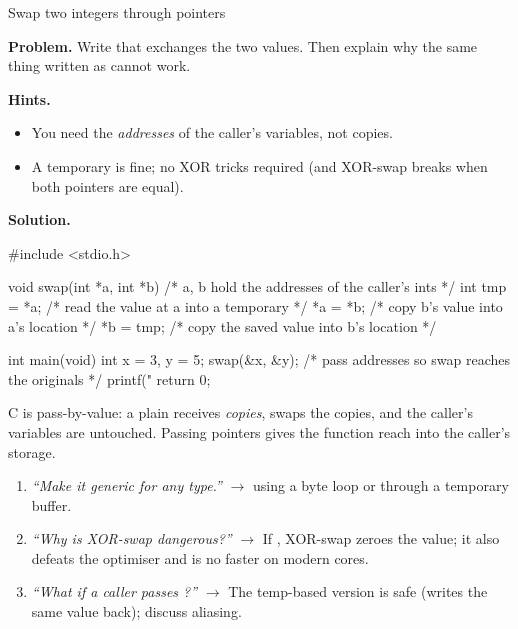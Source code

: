 \begin{gymproblem}{Swap two integers through pointers}

\textbf{Problem.} Write  that exchanges the
two values. Then explain why the same thing written as
 cannot work.

\textbf{Hints.}
\begin{itemize}
\item You need the \emph{addresses} of the caller's variables, not copies.
\item A temporary is fine; no XOR tricks required (and XOR-swap breaks when
  both pointers are equal).
\end{itemize}

\attempt

\textbf{Solution.}
\begin{cgym}
#include <stdio.h>

void swap(int *a, int *b) {   /* a, b hold the addresses of the caller's ints */
    int tmp = *a;             /* read the value at a into a temporary          */
    *a = *b;                  /* copy b's value into a's location              */
    *b = tmp;                 /* copy the saved value into b's location        */
}

int main(void) {
    int x = 3, y = 5;
    swap(&x, &y);             /* pass addresses so swap reaches the originals  */
    printf("%
    return 0;
}
\end{cgym}

C is pass-by-value: a plain  receives \emph{copies},
swaps the copies, and the caller's variables are untouched. Passing pointers
gives the function reach into the caller's storage.

\followups
\begin{enumerate}
\item \emph{``Make it generic for any type.''} $\rightarrow$
   using a byte loop or
   through a temporary buffer.
\item \emph{``Why is XOR-swap dangerous?''} $\rightarrow$ If ,
  XOR-swap zeroes the value; it also defeats the optimiser and is no faster
  on modern cores.
\item \emph{``What if a caller passes ?''} $\rightarrow$
  The temp-based version is safe (writes the same value back); discuss
  aliasing.
\end{enumerate}
\end{gymproblem}

